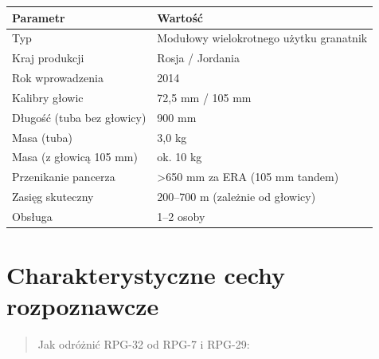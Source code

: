 \documentclass[12pt,openany,oneside]{book}
\begin{document}
\begin{longtable}[]{@{}ll@{}}
\toprule\noalign{}
Parametr & Wartość \\
\midrule\noalign{}
\endhead
\bottomrule\noalign{}
\endlastfoot
Typ & Modułowy wielokrotnego użytku granatnik \\
Kraj produkcji & Rosja / Jordania \\
Rok wprowadzenia & 2014 \\
Kalibry głowic & 72,5 mm / 105 mm \\
Długość (tuba bez głowicy) & 900 mm \\
Masa (tuba) & 3,0 kg \\
Masa (z głowicą 105 mm) & ok. 10 kg \\
Przenikanie pancerza & \textgreater650 mm za ERA (105 mm tandem) \\
Zasięg skuteczny & 200--700 m (zależnie od głowicy) \\
Obsługa & 1--2 osoby \\
\end{longtable}

\section{Charakterystyczne cechy
rozpoznawcze}\label{charakterystyczne-cechy-rozpoznawcze-75}

\begin{quote}
Jak odróżnić RPG-32 od RPG-7 i RPG-29:
\end{quote}
\end{document}
